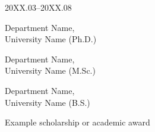 
\vitae
\begin{education}{20XX.03--20XX.08}
    \item[20XX.03--20XX.08] Department Name, \\University Name (Ph.D.)
    \item[20XX.03--20XX.02] Department Name, \\University Name (M.Sc.)
    \item[20XX.03--20XX.02] Department Name, \\University Name (B.S.)
\end{education}


\begin{award}
    \item Example scholarship or academic award
\end{award}

